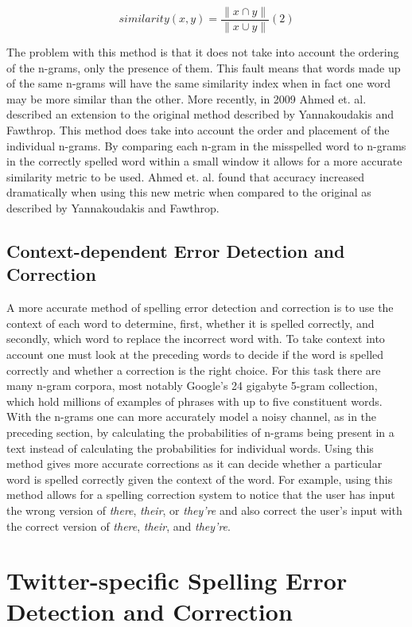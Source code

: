 \[
similarity(x,y) = \frac{\|x \cap y \|}{\|x \cup y \|} (2)
\]

The problem with this method is that it does not take into account the ordering of the n-grams, only the presence of them. This fault means that words made up of the same n-grams will have the same similarity index when in fact one word may be more similar than the other. More recently, in 2009 Ahmed et. al. described an extension to the original method described by Yannakoudakis and Fawthrop. This method does take into account the order and placement of the individual n-grams. By comparing each n-gram in the misspelled word to n-grams in the correctly spelled word within a small window it allows for a more accurate similarity metric to be used. Ahmed et. al. found that accuracy increased dramatically when using this new metric when compared to the original as described by Yannakoudakis and Fawthrop.

\subsection{Context-dependent Error Detection and Correction}

A more accurate method of spelling error detection and correction is to use the context of each word to determine, first, whether it is spelled correctly, and secondly, which word to replace the incorrect word with. To take context into account one must look at the preceding words to decide if the word is spelled correctly and whether a correction is the right choice. For this task there are many n-gram corpora, most notably Google's 24 gigabyte 5-gram collection, which hold millions of examples of phrases with up to five constituent words. With the n-grams one can more accurately model a noisy channel, as in the preceding section, by calculating the probabilities of n-grams being present in a text instead of calculating the probabilities for individual words. Using this method gives more accurate corrections as it can decide whether a particular word is spelled correctly given the context of the word. For example, using this method allows for a spelling correction system to notice that the user has input the wrong version of \emph{there}, \emph{their}, or \emph{they're} and also correct the user's input with the correct version of \emph{there}, \emph{their}, and \emph{they're}.

\section{Twitter-specific Spelling Error Detection and Correction}

